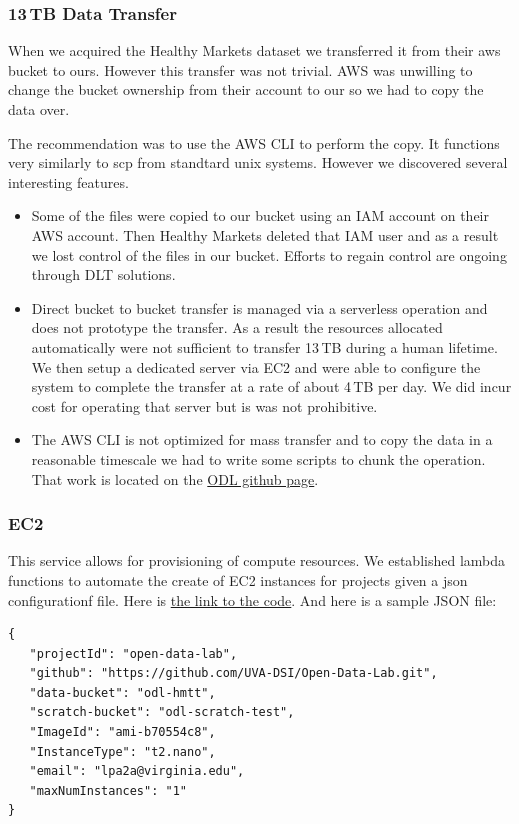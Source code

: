 \subsubsection{13\,TB Data Transfer}
When we acquired the Healthy Markets dataset we transferred it from their aws bucket to ours. However this transfer was not trivial. AWS was unwilling to change the bucket ownership from their account to our so we had to copy the data over.

The recommendation was to use the AWS CLI to perform the copy. It functions very similarly to scp from standtard unix systems. However we discovered several interesting features.
\begin{itemize}
\item Some of the files were copied to our bucket using an IAM account on their AWS account. Then Healthy Markets deleted that IAM user and as a result we lost control of the files in our bucket. Efforts to regain control are ongoing through DLT solutions.
\item Direct bucket to bucket transfer is managed via a serverless operation and does not prototype the transfer. As a result the resources allocated automatically were not sufficient to transfer 13\,TB during a human lifetime. We then setup a dedicated server via EC2 and were able to configure the system to complete the transfer at a rate of about 4\,TB per day. We did incur cost for operating that server but is was not prohibitive.
\item The AWS CLI is not optimized for mass transfer and to copy the data in a reasonable timescale we had to write some scripts to chunk the operation. That work is located on the \href{https://github.com/UVA-DSI/Open-Data-Lab/tree/master/aws/large_s3_transfer}{ODL github page}.
\end{itemize}

\subsubsection{EC2}
This service allows for provisioning of compute resources. We established lambda functions to automate the create of EC2 instances for projects given a json configurationf file. Here is \href{https://github.com/UVA-DSI/Open-Data-Lab/blob/master/aws/lambda/src/stand_up.py}{the link to the code}. And here is a sample JSON file:

\begin{verbatim}
{
   "projectId": "open-data-lab",
   "github": "https://github.com/UVA-DSI/Open-Data-Lab.git",
   "data-bucket": "odl-hmtt",
   "scratch-bucket": "odl-scratch-test",
   "ImageId": "ami-b70554c8",
   "InstanceType": "t2.nano",
   "email": "lpa2a@virginia.edu",
   "maxNumInstances": "1"
}
\end{verbatim}

